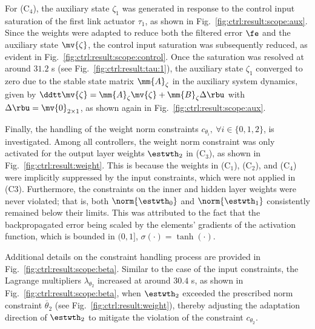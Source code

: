 \documentclass[letterpaper, journal]{IEEEtran}
\begin{document}
For (C$_4$), the auxiliary state $\zeta_1$ was generated in response to the control input saturation of the first link actuator $\tau_1$, as shown in Fig.~\ref{fig:ctrl:result:scope:aux}.
Since the weights were adapted to reduce both the filtered error $\fe$ and the auxiliary state $\mv{\zeta}$, the control input saturation was subsequently reduced, as evident in Fig.~\ref{fig:ctrl:result:scope:control}.
Once the saturation was resolved at around $31.2$ s (see Fig.~\ref{fig:ctrl:result:tau:1}), the auxiliary state $\zeta_1$ converged to zero due to the stable state matrix $\mm{A}_\zeta$ in the auxiliary system dynamics, given by $\ddtt\mv{\zeta} = \mm{A}_\zeta \mv{\zeta} + \mm{B}_\zeta \Delta\rbu$ with $\Delta\rbu=\mv{0}_{2\times1}$, as shown again in Fig.~\ref{fig:ctrl:result:scope:aux}.

\hfill 

Finally, the handling of the weight norm constraints $c_{\theta_i},\ \forall i\in\{0,1,2\}$, is investigated. 
Among all controllers, the weight norm constraint was only activated for the output layer weights $\estwth_2$ in (C$_3$), as shown in Fig.~\ref{fig:ctrl:result:weight}. 
This is because the weights in (C$_1$), (C$_2$), and (C$_4$) were implicitly suppressed by the input constraints, which were not applied in (C3).
Furthermore, the constraints on the inner and hidden layer weights were never violated; that is, both $\norm{\estwth_0}$ and $\norm{\estwth_1}$ consistently remained below their limits.
This was attributed to the fact that the backpropagated error being scaled by the elements' gradients of the activation function, which is bounded in $(0,1]$, \ie $\sigma(\cdot)=\tanh(\cdot)$.

Additional details on the constraint handling process are provided in Fig.~\ref{fig:ctrl:result:scope:beta}. 
Similar to the case of the input constraints, the Lagrange multipliers $\lambda_{\theta_2}$ increased at around $30.4$ s, as shown in Fig.~\ref{fig:ctrl:result:scope:beta}, when $\estwth_2$ exceeded the prescribed norm constraint $\overline\theta_2$ (see Fig.~\ref{fig:ctrl:result:weight}), thereby adjusting the adaptation direction of $\estwth_2$ to mitigate the violation of the constraint $c_{\theta_2}$.

\end{document}
